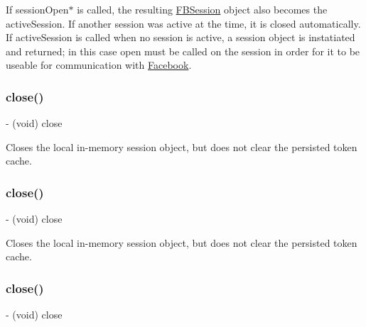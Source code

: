 If session\+Open$\ast$ is called, the resulting {\ttfamily \hyperlink{interfaceFBSession}{F\+B\+Session}} object also becomes the active\+Session. If another session was active at the time, it is closed automatically. If active\+Session is called when no session is active, a session object is instatiated and returned; in this case open must be called on the session in order for it to be useable for communication with \hyperlink{interfaceFacebook}{Facebook}. \mbox{\label{interfaceFBSession_a91eccb960e90fc8cc6d24df1b2e94ce3}} 
\subsubsection{\texorpdfstring{close()}{close()}\hspace{0.1cm}{\footnotesize\ttfamily [1/5]}}
{\footnotesize\ttfamily -\/ (void) close \begin{DoxyParamCaption}{ }\end{DoxyParamCaption}}

Closes the local in-\/memory session object, but does not clear the persisted token cache. \mbox{\label{interfaceFBSession_a91eccb960e90fc8cc6d24df1b2e94ce3}} 
\subsubsection{\texorpdfstring{close()}{close()}\hspace{0.1cm}{\footnotesize\ttfamily [2/5]}}
{\footnotesize\ttfamily -\/ (void) close \begin{DoxyParamCaption}{ }\end{DoxyParamCaption}}

Closes the local in-\/memory session object, but does not clear the persisted token cache. \mbox{\label{interfaceFBSession_a91eccb960e90fc8cc6d24df1b2e94ce3}} 
\subsubsection{\texorpdfstring{close()}{close()}\hspace{0.1cm}{\footnotesize\ttfamily [3/5]}}
{\footnotesize\ttfamily -\/ (void) close \begin{DoxyParamCaption}{ }\end{DoxyParamCaption}}

